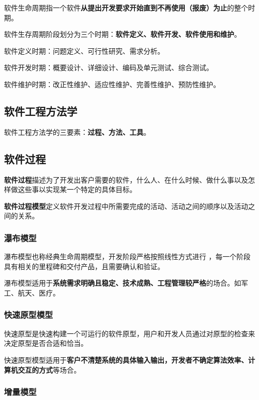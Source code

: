 \documentclass[cn, blue, normal, 12pt]{elegantnote}
\begin{document}
软件生命周期指一个软件\textbf{从提出开发要求开始直到不再使用（报废）为止}的整个时期。

软件生存周期阶段划分为三个时期：\textbf{软件定义、软件开发、软件使用和维护}。

软件定义时期：问题定义、可行性研究、需求分析。

软件开发时期：概要设计、详细设计、编码及单元测试、综合测试。

软件维护时期：改正性维护、适应性维护、完善性维护、预防性维护。

\subsection{软件工程方法学}

软件工程方法学的三要素：\textbf{过程、方法、工具}。

\subsection{软件过程}

\textbf{软件过程}描述为了开发出客户需要的软件，什么人、在什么时候、做什么事以及怎样做这些事以实现某一个特定的具体目标。

\textbf{软件过程模型}定义软件开发过程中所需要完成的活动、活动之间的顺序以及活动之间的关系。

\subsubsection{瀑布模型}

瀑布模型也称经典生命周期模型，开发阶段严格按照线性方式进行
，每一个阶段具有相关的里程碑和交付产品，且需要确认和验证。

瀑布模型适用于\textbf{系统需求明确且稳定、技术成熟、工程管理较严格}的场合。如军工、航天、医疗。

\subsubsection{快速原型模型}

快速原型是快速构建一个可运行的软件原型，用户和开发人员通过对原型的检查来决定原型是否合适和恰当。

快速原型模型适用于\textbf{客户不清楚系统的具体输入输出，开发者不确定算法效率、计算机交互的方式}等场合。

\subsubsection{增量模型}
\end{document}
